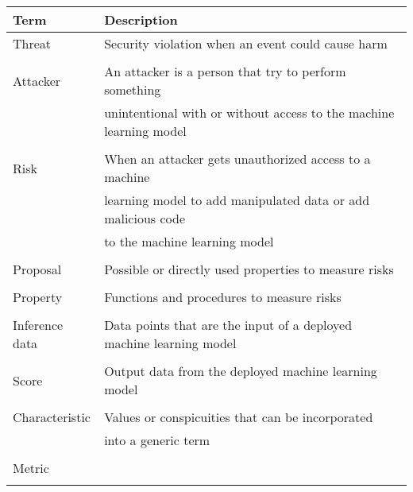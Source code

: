 \begin{tabular}{ |l|l|  }
  \hline
  \rowcolor{lightgray} Term & Description \\ [0.5ex]
  \hline
  Threat & Security violation when an event could cause harm \cite{shirey2007internet} \\
  & \\
  \hline
  Attacker & An attacker is a person that try to perform something \\
  & unintentional with or without access to the machine learning model \\
  & \\
  \hline
  Risk & When an attacker gets unauthorized access to a machine  \\
  & learning model to add manipulated data or add malicious code \\
  & to the machine learning model \\
  & \\
  \hline
  Proposal & Possible or directly used properties to measure risks \\
  & \\
  \hline
  Property & Functions and procedures to measure risks \\
  & \\
  \hline
  Inference data & Data points that are the input of a deployed machine learning model \\
  & \\
  \hline
  Score & Output data from the deployed machine learning model \\
  & \\
  \hline
  Characteristic & Values or conspicuities that can be incorporated \\
  & into a generic term \\
  & \\
  \hline
  Metric & \\
  & \\
  \hline
\end{tabular}
